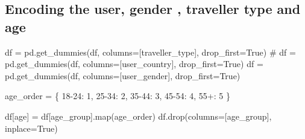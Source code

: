 \documentclass[
  letterpaper,
  DIV=11,
  numbers=noendperiod]{scrartcl}
\newenvironment{Shaded}{\begin{snugshade}}{\end{snugshade}}
\newcommand{\BuiltInTok}[1]{\textcolor[rgb]{0.00,0.23,0.31}{#1}}
\newcommand{\CommentTok}[1]{\textcolor[rgb]{0.37,0.37,0.37}{#1}}
\newcommand{\DecValTok}[1]{\textcolor[rgb]{0.68,0.00,0.00}{#1}}
\newcommand{\NormalTok}[1]{\textcolor[rgb]{0.00,0.23,0.31}{#1}}
\newcommand{\OperatorTok}[1]{\textcolor[rgb]{0.37,0.37,0.37}{#1}}
\newcommand{\StringTok}[1]{\textcolor[rgb]{0.13,0.47,0.30}{#1}}
\newcommand{\VariableTok}[1]{\textcolor[rgb]{0.07,0.07,0.07}{#1}}
\begin{document}
\subsection{Encoding the user, gender , traveller type and
age}\label{encoding-the-user-gender-traveller-type-and-age}

\begin{Shaded}
\begin{Highlighting}[]
\NormalTok{df }\OperatorTok{=}\NormalTok{ pd.get\_dummies(df, columns}\OperatorTok{=}\NormalTok{[}\StringTok{\textquotesingle{}traveller\_type\textquotesingle{}}\NormalTok{], drop\_first}\OperatorTok{=}\VariableTok{True}\NormalTok{)}
\CommentTok{\# df = pd.get\_dummies(df, columns=[\textquotesingle{}user\_country\textquotesingle{}], drop\_first=True)}
\NormalTok{df }\OperatorTok{=}\NormalTok{ pd.get\_dummies(df, columns}\OperatorTok{=}\NormalTok{[}\StringTok{\textquotesingle{}user\_gender\textquotesingle{}}\NormalTok{], drop\_first}\OperatorTok{=}\VariableTok{True}\NormalTok{)}

\NormalTok{age\_order }\OperatorTok{=}\NormalTok{ \{}
    \StringTok{\textquotesingle{}18{-}24\textquotesingle{}}\NormalTok{: }\DecValTok{1}\NormalTok{,}
    \StringTok{\textquotesingle{}25{-}34\textquotesingle{}}\NormalTok{: }\DecValTok{2}\NormalTok{,}
    \StringTok{\textquotesingle{}35{-}44\textquotesingle{}}\NormalTok{: }\DecValTok{3}\NormalTok{,}
    \StringTok{\textquotesingle{}45{-}54\textquotesingle{}}\NormalTok{: }\DecValTok{4}\NormalTok{,}
    \StringTok{\textquotesingle{}55+\textquotesingle{}}\NormalTok{: }\DecValTok{5}
\NormalTok{\}}

\NormalTok{df[}\StringTok{\textquotesingle{}age\textquotesingle{}}\NormalTok{] }\OperatorTok{=}\NormalTok{ df[}\StringTok{\textquotesingle{}age\_group\textquotesingle{}}\NormalTok{].}\BuiltInTok{map}\NormalTok{(age\_order)}
\NormalTok{df.drop(columns}\OperatorTok{=}\NormalTok{[}\StringTok{\textquotesingle{}age\_group\textquotesingle{}}\NormalTok{], inplace}\OperatorTok{=}\VariableTok{True}\NormalTok{)}
\end{Highlighting}
\end{Shaded}
\end{document}
